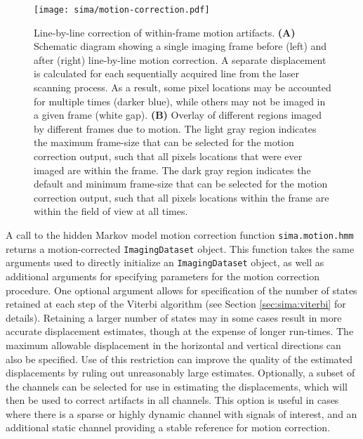 \begin{figure}[hb!]
\centering
\texttt{[image: sima/motion-correction.pdf]}
\caption[Line-by-line correction of within-frame motion artifacts]{
 	Line-by-line correction of within-frame motion artifacts.
 	\textbf{(A)} Schematic diagram showing a single imaging frame before (left) and after (right)  line-by-line motion correction. 
	A separate displacement is calculated for each sequentially acquired line from the laser scanning process. As a result, some pixel locations may be accounted for multiple times (darker blue), while others may not be imaged in a given frame (white gap).
	\textbf{(B)} Overlay of different regions imaged by different frames due to motion. The light gray region indicates the maximum frame-size that can be selected for the motion correction output, such that all pixels locations that were ever imaged are within the frame. The dark gray region indicates the default and minimum frame-size that can be selected for the motion correction output, such that all pixels locations within the frame are within the field of view at all times.
 	}
 	\label{fig:sima:motion}
\end{figure}

A call to the hidden Markov model motion correction function \verb|sima.motion.hmm| returns a
motion-corrected \verb|ImagingDataset| object.
This function takes the same arguments used to directly initialize an
\verb|ImagingDataset| object, as well as additional arguments for specifying
parameters for the motion correction procedure.
One optional argument allows for specification of the number of states retained 
at each step of the Viterbi algorithm (see Section \ref{sec:sima:viterbi} for details).
Retaining a larger number of states may in some cases result in more accurate
displacement estimates, though at the expense of longer run-times.
The maximum allowable displacement in the horizontal and vertical directions 
can also be specified. 
Use of this restriction can improve the quality of the estimated displacements
by ruling out unreasonably large estimates.
Optionally, a subset of the channels can be selected for use in estimating
the displacements, which will then be used to correct artifacts in all channels.
This option is useful in cases where there is a sparse or highly dynamic channel with
signals of interest, and an additional static channel providing a stable
reference for motion correction.

